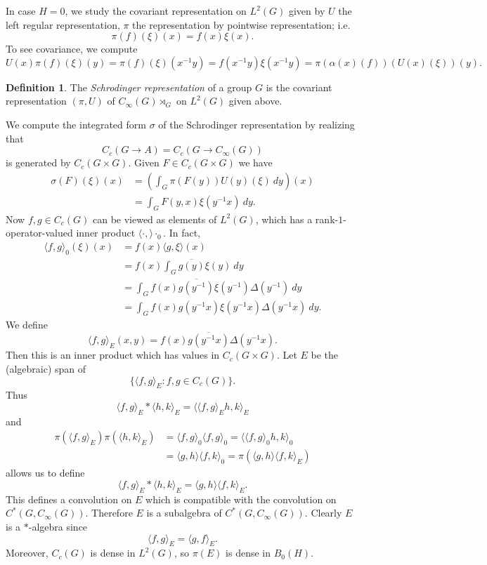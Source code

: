 \documentclass[12pt]{report}
\newcommand{\dfn}[1]{\emph{#1}\index{#1}}
\theoremstyle{definition}
\newtheorem{definition}[theorem]{Definition}
\begin{document}
    In case $H = 0$, we study the covariant representation on $L^2(G)$ given by $U$ the left regular representation, $\pi$ the representation by pointwise representation; i.e.
        $$\pi(f)(\xi)(x) = f(x)\xi(x).$$
    To see covariance, we compute
    $$U(x)\pi(f)(\xi)(y) = \pi(f)(\xi)(x^{-1}y) = f(x^{-1}y) \xi(x^{-1}y) = \pi(\alpha(x)(f))(U(x)(\xi))(y).$$
\begin{definition}
    The \dfn{Schrodinger representation} of a group $G$ is the covariant representation $(\pi, U)$ of $C_\infty(G) \rtimes_G$ on $L^2(G)$ given above.
\end{definition}
    We compute the integrated form $\sigma$ of the Schrodinger representation by realizing that
    $$C_c(G \to A) = C_c(G \to C_\infty(G))$$
    is generated by $C_c(G \times G)$. Given $F \in C_c(G \times G)$ we have
    \begin{align*}\sigma(F)(\xi)(x) &= \left(\int_G \pi(F(y))U(y)(\xi) ~dy \right)(x)
    \\&= \int_G F(y, x) \xi(y^{-1}x) ~dy.
    \end{align*}
    Now $f, g \in C_c(G)$ can be viewed as elements of $L^2(G)$, which has a rank-$1$-operator-valued inner product $\langle\cdot,\rangle\cdot_0$. In fact,
    \begin{align*}\langle f, g\rangle_0(\xi)(x) &= f(x) \langle g, \xi\rangle(x) \\
    &= f(x) \int_G \overline{g(y)}\xi(y) ~dy
    \\&= \int_G f(x) \overline{g(y^{-1})} \xi(y^{-1}) \Delta(y^{-1}) ~dy\\
    &= \int_G f(x) g(y^{-1}x) \xi(y^{-1}x) \Delta(y^{-1}x) ~dy.
    \end{align*}
    We define
    $$\langle f, g\rangle_E (x, y) = f(x) \overline{g(y^{-1}x)} \Delta(y^{-1}x).$$
    Then this is an inner product which has values in $C_c(G \times G)$. Let $E$ be the (algebraic) span of
    $$\{\langle f, g\rangle_E: f,g \in C_c(G)\}.$$
    Thus
    $$\langle f, g\rangle_E * \langle h, k\rangle_E = \langle \langle f, g\rangle_E h, k\rangle_E$$
    and
    \begin{align*}\pi(\langle f, g\rangle_E) \pi(\langle h, k\rangle_E) &= \langle f, g\rangle_0 \langle f, g\rangle_0 = \langle \langle f, g\rangle_0 h, k\rangle_0 \\
    &= \langle g, h\rangle \langle f, k\rangle_0 = \pi(\langle g, h\rangle \langle f, k\rangle_E)
    \end{align*}
    allows us to define
    $$\langle f, g\rangle_E * \langle h, k\rangle_E = \langle g, h\rangle \langle f, k\rangle_E.$$
    This defines a convolution on $E$ which is compatible with the convolution on $C^*(G, C_\infty(G))$. Therefore $E$ is a subalgebra of $C^*(G, C_\infty(G))$. Clearly $E$ is a $*$-algebra since
    $$\langle f, g\rangle_E = \langle g, f\rangle_E.$$
    Moreover, $C_c(G)$ is dense in $L^2(G)$, so $\pi(E)$ is dense in $B_0(H)$.
\end{document}
